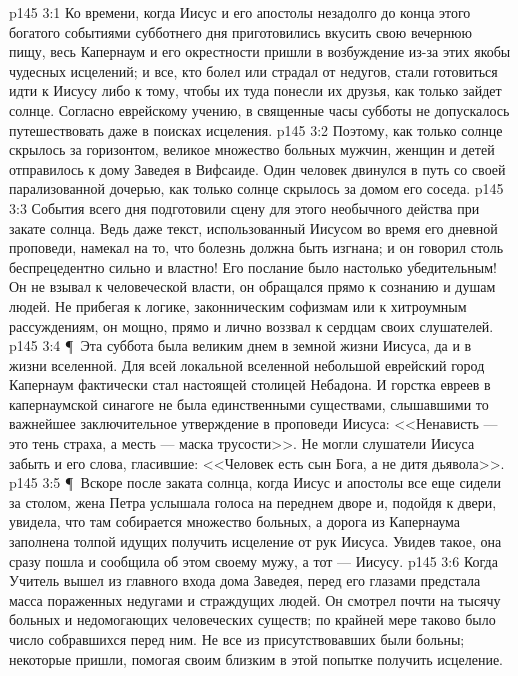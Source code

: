 \vs p145 3:1 Ко времени, когда Иисус и его апостолы незадолго до конца этого богатого событиями субботнего дня приготовились вкусить свою вечернюю пищу, весь Капернаум и его окрестности пришли в возбуждение из\hyp{}за этих якобы чудесных исцелений; и все, кто болел или страдал от недугов, стали готовиться идти к Иисусу либо к тому, чтобы их туда понесли их друзья, как только зайдет солнце. Согласно еврейскому учению, в священные часы субботы не допускалось путешествовать даже в поисках исцеления.
\vs p145 3:2 Поэтому, как только солнце скрылось за горизонтом, великое множество больных мужчин, женщин и детей отправилось к дому Заведея в Вифсаиде. Один человек двинулся в путь со своей парализованной дочерью, как только солнце скрылось за домом его соседа.
\vs p145 3:3 События всего дня подготовили сцену для этого необычного действа при закате солнца. Ведь даже текст, использованный Иисусом во время его дневной проповеди, намекал на то, что болезнь должна быть изгнана; и он говорил столь беспрецедентно сильно и властно! Его послание было настолько убедительным! Он не взывал к человеческой власти, он обращался прямо к сознанию и душам людей. Не прибегая к логике, законническим софизмам или к хитроумным рассуждениям, он мощно, прямо и лично воззвал к сердцам своих слушателей.
\vs p145 3:4 \P\ Эта суббота была великим днем в земной жизни Иисуса, да и в жизни вселенной. Для всей локальной вселенной небольшой еврейский город Капернаум фактически стал настоящей столицей Небадона. И горстка евреев в капернаумской синагоге не была единственными существами, слышавшими то важнейшее заключительное утверждение в проповеди Иисуса: <<Ненависть --- это тень страха, а месть --- маска трусости>>. Не могли слушатели Иисуса забыть и его слова, гласившие: <<Человек есть сын Бога, а не дитя дьявола>>.
\vs p145 3:5 \P\ Вскоре после заката солнца, когда Иисус и апостолы все еще сидели за столом, жена Петра услышала голоса на переднем дворе и, подойдя к двери, увидела, что там собирается множество больных, а дорога из Капернаума заполнена толпой идущих получить исцеление от рук Иисуса. Увидев такое, она сразу пошла и сообщила об этом своему мужу, а тот --- Иисусу.
\vs p145 3:6 Когда Учитель вышел из главного входа дома Заведея, перед его глазами предстала масса пораженных недугами и страждущих людей. Он смотрел почти на тысячу больных и недомогающих человеческих существ; по крайней мере таково было число собравшихся перед ним. Не все из присутствовавших были больны; некоторые пришли, помогая своим близким в этой попытке получить исцеление.

